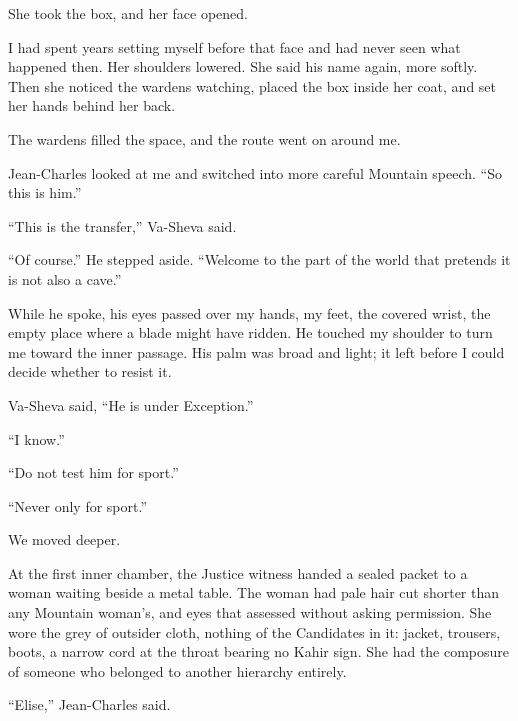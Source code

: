 She took the box, and her face opened.\par

I had spent years setting myself before that face and had never seen what happened then. Her shoulders lowered. She said his name again, more softly. Then she noticed the wardens watching, placed the box inside her coat, and set her hands behind her back.\par

The wardens filled the space, and the route went on around me.\par

Jean-Charles looked at me and switched into more careful Mountain speech. ``So this is him.''\par

``This is the transfer,'' Va-Sheva said.\par

``Of course.'' He stepped aside. ``Welcome to the part of the world that pretends it is not also a cave.''\par

While he spoke, his eyes passed over my hands, my feet, the covered wrist, the empty place where a blade might have ridden. He touched my shoulder to turn me toward the inner passage. His palm was broad and light; it left before I could decide whether to resist it.\par

Va-Sheva said, ``He is under Exception.''\par

``I know.''\par

``Do not test him for sport.''\par

``Never only for sport.''\par

We moved deeper.\par

At the first inner chamber, the Justice witness handed a sealed packet to a woman waiting beside a metal table. The woman had pale hair cut shorter than any Mountain woman's, and eyes that assessed without asking permission. She wore the grey of outsider cloth, nothing of the Candidates in it: jacket, trousers, boots, a narrow cord at the throat bearing no Kahir sign. She had the composure of someone who belonged to another hierarchy entirely.\par

``Elise,'' Jean-Charles said.\par

